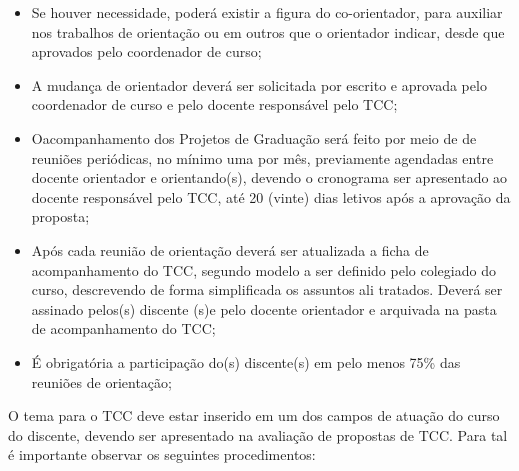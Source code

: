 \begin{itemize}
	\item Se houver necessidade, poderá existir a figura do co-orientador, para auxiliar nos trabalhos de orientação ou em outros que o orientador indicar, desde que aprovados pelo coordenador de curso;

	\item A mudança de orientador deverá ser solicitada por escrito e aprovada pelo coordenador de curso e pelo docente responsável pelo TCC;

	 \item Oacompanhamento dos Projetos de Graduação será feito por meio de de reuniões periódicas, no mínimo uma por mês, previamente agendadas entre docente orientador e orientando(s), devendo o cronograma ser apresentado ao docente responsável pelo TCC, até 20 (vinte) dias letivos após a aprovação da proposta;

	 \item Após cada reunião de orientação deverá ser atualizada a ficha de acompanhamento do TCC, segundo modelo a ser definido pelo colegiado do curso, descrevendo de forma simplificada os assuntos ali tratados. Deverá ser assinado pelos(s) discente (s)e pelo docente orientador e arquivada na pasta de acompanhamento do TCC;

	 \item É obrigatória a participação do(s) discente(s) em pelo menos 75\% das reuniões de orientação;
\end{itemize}

	 O tema para o TCC deve estar inserido em um dos campos de atuação do curso do discente, devendo ser apresentado na avaliação de propostas de TCC. Para tal é importante observar os seguintes procedimentos:
	 
